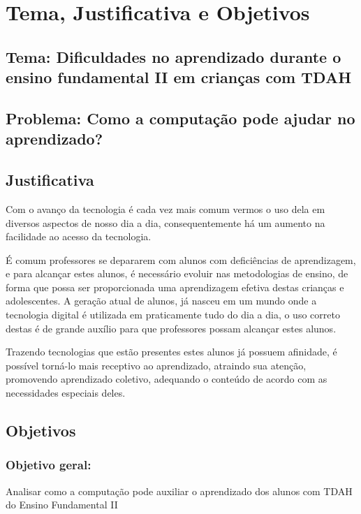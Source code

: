 \chapter{Tema, Justificativa e Objetivos}

\section*{Tema: Dificuldades no aprendizado durante o ensino fundamental II em crianças com TDAH}

\section*{Problema: Como a computação pode ajudar no aprendizado?}

\section{Justificativa}

Com o avanço da tecnologia é cada vez mais comum vermos o uso dela em diversos aspectos de nosso dia a dia, consequentemente há um aumento na facilidade ao acesso da tecnologia.

É comum professores se depararem com alunos com deficiências de aprendizagem, e para alcançar estes alunos, é necessário evoluir nas metodologias de ensino, de forma que possa ser proporcionada uma aprendizagem efetiva destas crianças e adolescentes. A geração atual de alunos, já nasceu em um mundo onde a tecnologia digital é utilizada em praticamente tudo do dia a dia, o uso correto destas é de grande auxílio para que professores possam alcançar estes alunos.

Trazendo tecnologias que estão presentes estes alunos já possuem afinidade, é possível torná-lo mais receptivo ao aprendizado, atraindo sua atenção, promovendo aprendizado coletivo, adequando o conteúdo de acordo com as necessidades especiais deles.

\section{Objetivos}

\subsection{Objetivo geral:} Analisar como a computação pode auxiliar o aprendizado dos alunos com TDAH do Ensino Fundamental II

